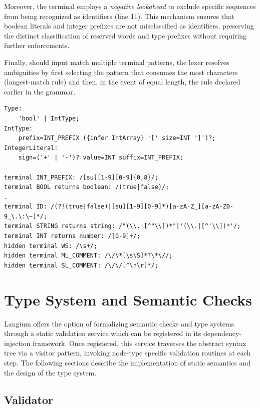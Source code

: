 Moreover, the  terminal employs a \textit{negative lookahead} to exclude specific sequences from being recognized as identifiers (line 11). This mechanism ensures that boolean literals and integer prefixes are not misclassified as identifiers, preserving the distinct classification of reserved words and type prefixes without requiring further enforcements.

Finally, should input match multiple terminal patterns, the lexer resolves ambiguities by first selecting the pattern that consumes the most characters (longest-match rule) and then, in the event of equal length, the rule declared earlier in the grammar.

\begin{verbatim}
Type:
    'bool' | IntType;
IntType:
    prefix=INT_PREFIX ({infer IntArray} '[' size=INT ']')?;
IntegerLiteral:
    sign=('+' | '-')? value=INT suffix=INT_PREFIX;

terminal INT_PREFIX: /[su][1-9][0-9]{0,8}/;
terminal BOOL returns boolean: /(true|false)/;
.
terminal ID: /(?!(true|false)|[su][1-9][0-9]*)[a-zA-Z_][a-zA-Z0-9_\.\:\~]*/;
terminal STRING returns string: /"(\\.|[^"\\])*"|'(\\.|[^'\\])*'/;
terminal INT returns number: /[0-9]+/;
hidden terminal WS: /\s+/;
hidden terminal ML_COMMENT: /\/\*[\s\S]*?\*\//;
hidden terminal SL_COMMENT: /\/\/[^\n\r]*/;
\end{verbatim}

\section{Type System and Semantic Checks}

Langium offers the option of formalizing semantic checks and type systems through a static validation service which can be registered in its dependency-injection framework.
Once registered, this service traverses the abstract syntax tree via a visitor pattern, invoking node-type specific validation routines at each step.
The following sections describe the implementation of static semantics and the design of the type system.

\subsection*{Validator}

